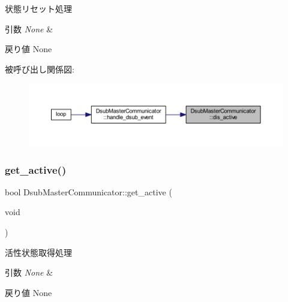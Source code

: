 状態リセット処理 


\begin{DoxyParams}{引数}
{\em None} & \\
\hline
\end{DoxyParams}
\begin{DoxyReturn}{戻り値}
None 
\end{DoxyReturn}
被呼び出し関係図\+:
\nopagebreak
\begin{figure}[H]
\begin{center}
\leavevmode
\includegraphics[width=350pt]{class_dsub_master_communicator_ac0a9298c691adbdf844f85d680d7e554_icgraph}
\end{center}
\end{figure}
\mbox{\label{class_dsub_master_communicator_a81a0576ab39cc508c879336038c4fd4a}} 
\subsubsection{\texorpdfstring{get\_active()}{get\_active()}}
{\footnotesize\ttfamily bool Dsub\+Master\+Communicator\+::get\+\_\+active (\begin{DoxyParamCaption}\item[{void}]{ }\end{DoxyParamCaption})}



活性状態取得処理 


\begin{DoxyParams}{引数}
{\em None} & \\
\hline
\end{DoxyParams}
\begin{DoxyReturn}{戻り値}
None 
\end{DoxyReturn}
\mbox{\label{class_dsub_master_communicator_a91a5a356d0aa58a30f3381522cd7616f}} 
